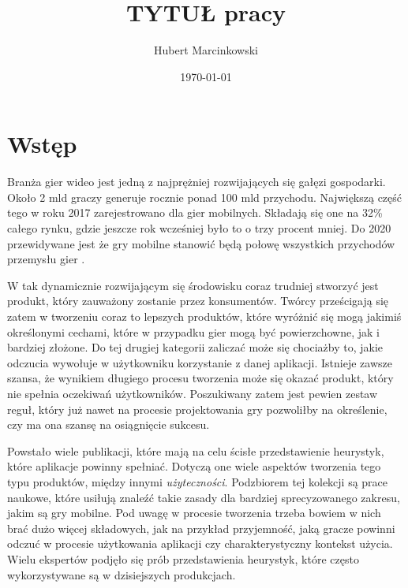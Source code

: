 \documentclass[a4paper,12pt,numbers=noenddot]{report}
\title{TYTUŁ pracy}
\date{\today}
\author{Hubert Marcinkowski}
\begin{document}
	\nocite{*}
	

	\newpage
	\tableofcontents
	\newpage
\chapter{Wstęp}
Branża gier wideo jest jedną z najprężniej rozwijających się gałęzi gospodarki. Około 2 mld graczy generuje rocznie ponad 100 mld przychodu. Największą część tego w roku 2017 zarejestrowano dla gier mobilnych. Składają się one na 32\% całego rynku, gdzie jeszcze rok wcześniej było to o trzy procent mniej. Do 2020 przewidywane jest że gry mobilne stanowić będą połowę wszystkich przychodów przemysłu gier \cite{art_Market2017}. 

W tak dynamicznie rozwijającym się środowisku coraz trudniej stworzyć jest produkt, który zauważony zostanie przez konsumentów. Twórcy prześcigają się zatem w tworzeniu coraz to lepszych produktów, które wyróżnić się mogą jakimiś określonymi cechami, które w przypadku gier mogą być powierzchowne, jak i bardziej złożone. Do tej drugiej kategorii zaliczać może się chociażby to, jakie odczucia wywołuje w użytkowniku korzystanie z danej aplikacji. Istnieje zawsze szansa, że wynikiem długiego procesu tworzenia może się okazać produkt, który nie spełnia oczekiwań użytkowników. Poszukiwany zatem jest pewien zestaw reguł, który już nawet na procesie projektowania gry pozwoliłby na określenie, czy ma ona szansę na osiągnięcie sukcesu. 

Powstało wiele publikacji, które mają na celu ścisłe przedstawienie heurystyk, które aplikacje powinny spełniać. Dotyczą one wiele aspektów tworzenia tego typu produktów, między innymi \textit{użyteczności}. Podzbiorem tej kolekcji są prace naukowe, które usiłują znaleźć takie zasady dla bardziej sprecyzowanego zakresu, jakim są gry mobilne. Pod uwagę w procesie tworzenia trzeba bowiem w nich brać dużo więcej składowych, jak na przykład przyjemność, jaką gracze powinni odczuć w procesie użytkowania aplikacji czy charakterystyczny kontekst użycia. Wielu ekspertów podjęło się prób przedstawienia heurystyk, które często wykorzystywane są w dzisiejszych produkcjach.
\end{document}
